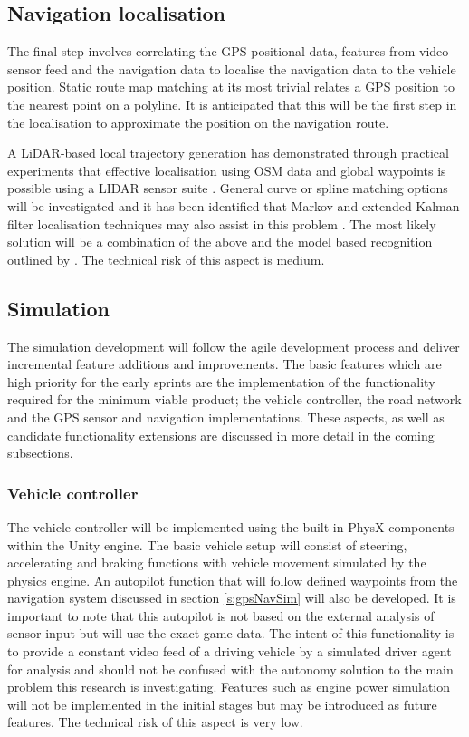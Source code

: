\documentclass[]{aiaa-tc}%
\begin{document}
\subsection{Navigation localisation}

The final step involves correlating the GPS positional data, features from video sensor feed and the navigation data to localise the navigation data to the vehicle position. Static route map matching at its most trivial relates a GPS position to the nearest point on a polyline. It is anticipated that this will be the first step in the localisation to approximate the position on the navigation route. 

A LiDAR-based local trajectory generation has demonstrated through practical experiments that effective localisation using OSM data and global waypoints is possible using a LIDAR sensor suite \cite{mitLocalNavDriving}. General curve or spline matching options will be investigated and it has been identified that Markov and extended Kalman filter localisation techniques may also assist in this problem \citep{probabalisticRobotics}. The most likely solution will be a combination of the above and the model based recognition outlined by \citet{modelBasedIntersection}. The technical risk of this aspect is medium.

\subsection{Simulation}

The simulation development will follow the agile development process and deliver incremental feature additions and improvements. The basic features which are high priority for the early sprints are the implementation of the functionality required for the minimum viable product; the vehicle controller, the road network and the GPS sensor and navigation implementations. These aspects, as well as candidate functionality extensions are discussed in more detail in the coming subsections.

\subsubsection{Vehicle controller}

The vehicle controller will be implemented using the built in PhysX components within the Unity engine. The basic vehicle setup will consist of steering, accelerating and braking functions with vehicle movement simulated by the physics engine. An autopilot function that will follow defined waypoints from the navigation system discussed in section \ref{s:gpsNavSim} will also be developed. It is important to note that this autopilot is not based on the external analysis of sensor input but will use the exact game data. The intent of this functionality is to provide a constant video feed of a driving vehicle by a simulated driver agent for analysis and should not be confused with the autonomy solution to the main problem this research is investigating. Features such as engine power simulation will not be implemented in the initial stages but may be introduced as future features. The technical risk of this aspect is very low.
\end{document}
